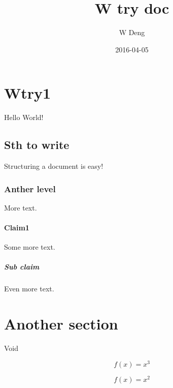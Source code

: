 \documentclass{article}
\title{W try doc}
\date{2016-04-05}
\author{W Deng}
\begin{document}
  \maketitle
  \newpage

\section{Wtry1}

Hello World!

\subsection{Sth to write}

Structuring a document is easy!

\subsubsection{Anther level}

More text.

\paragraph{Claim1}

Some more text.

\subparagraph{Sub claim}

Even more text.

\section{Another section}
Void

\begin{equation}
  f(x) = x^3
\end{equation}

\begin{equation*}
  f(x) = x^2
\end{equation*}
\end{document}
